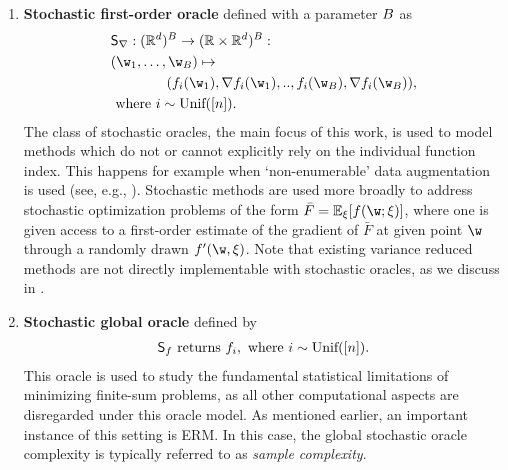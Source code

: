 \documentclass{article}
\theoremstyle{definition}  \newtheorem{exercise}{Exercise}
\theoremstyle{plain}
\newcommand{\pref}[1]{\prettyref{#1}}
\newcommand{\EE}{\mathbb{E}}
\newcommand{\RR}{\mathbb{R}}
\DeclarePairedDelimiter{\prn}{(}{)}
\theoremstyle{definition}
\theoremstyle{remark}
\begin{document}
\begin{enumerate}[leftmargin=0.3cm]
		\item \textbf{Stochastic first-order oracle} defined with a parameter 
		$B$ as 		
		\begin{align}		\label{eq:stoch_orc}
		&\orcsfn:(\RR^d)^{\query} \to(\RR\times \RR^d)^{\query}:\\
		&(\w_1,\dots,\w_\query)\mapsto \nonumber\\
		&\qquad \qquad \prn*{f_i(\w_1),\nabla f_i(\w_1),.., f_i(\w_\query),\nabla 
		f_i(\w_\query)}, 
		\nonumber\\
		 &\text{ where } i\sim\text{Unif}([n])\nonumber.
		\end{align}
		The class of stochastic oracles, the main focus of this work, is used 
		to model methods which do not or cannot explicitly rely on the individual 
		function index. This happens for example when `non-enumerable' data 
		augmentation is used (see, e.g., \cite{loosli2007training}). 
		Stochastic 
		methods are used more broadly to address stochastic optimization 
		problems of the form $\bar{F}=\EE_\xi[f(\w;\xi)]$, where one is 
		given 
		access to a first-order estimate of the gradient of $\bar{F}$ at 
		given 
		point $\w$ through a randomly drawn  $f'(\w,\xi)$. Note that 
		existing 
		variance 
		reduced methods are not directly implementable with  stochastic oracles, as we discuss in \pref{sec:related}.



		\item \textbf{Stochastic global oracle} defined by 
		\begin{align}
		\mathsf{S}_{f} \text{ returns } f_i, \text{ where 
		} 	i\sim\text{Unif}([n]).
		\end{align}
		This oracle is used to study the fundamental statistical limitations 
		of minimizing finite-sum problems, as all other computational 
		aspects 
		are disregarded under this oracle model. As mentioned earlier, an 
		important instance of this setting is ERM. In this case, 
		the 
		global stochastic oracle complexity is typically referred to as 
		\emph{sample complexity}.
		
	\end{enumerate}
	
\end{document}
